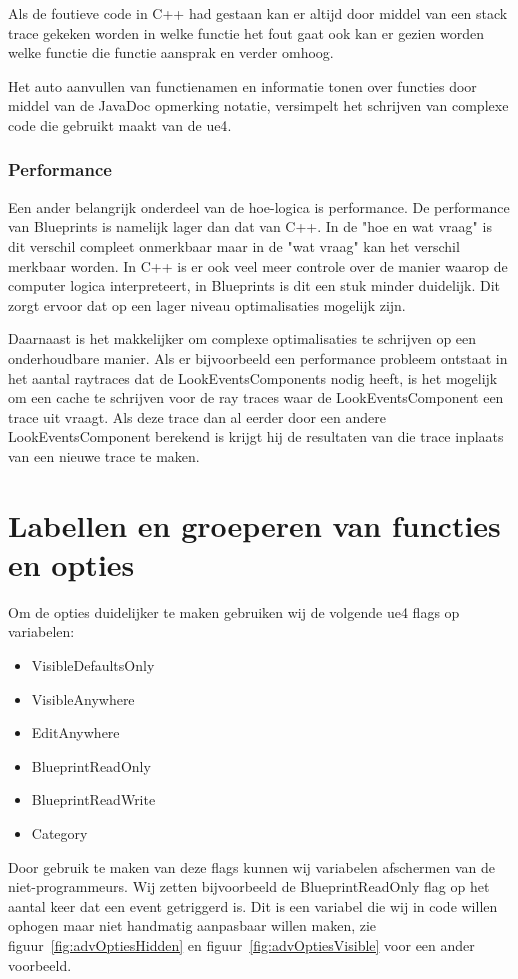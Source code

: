 Als de foutieve code in C++ had gestaan kan er altijd door middel van een stack trace gekeken worden in welke functie het fout gaat ook kan er gezien worden welke functie die functie aansprak en verder omhoog.

Het auto aanvullen van functienamen en informatie tonen over functies door middel van de JavaDoc opmerking notatie, versimpelt het schrijven van complexe code die gebruikt maakt van de \gls{ue4}. 

\subsubsection{Performance}
Een ander belangrijk onderdeel van de hoe-logica is performance. De performance van Blueprints is namelijk lager dan dat van C++. In de "hoe en wat vraag" is dit verschil compleet onmerkbaar maar in de "wat vraag" kan het verschil merkbaar worden.
In C++ is er ook veel meer controle over de manier waarop de computer logica interpreteert, in Blueprints is dit een stuk minder duidelijk. Dit zorgt ervoor dat op een lager niveau optimalisaties mogelijk zijn. 

Daarnaast is het makkelijker om complexe optimalisaties te schrijven op een onderhoudbare manier. Als er bijvoorbeeld een performance probleem ontstaat in het aantal raytraces dat de LookEventsComponents nodig heeft, is het mogelijk om een cache te schrijven voor de ray traces waar de LookEventsComponent een trace uit vraagt. Als deze trace dan al eerder door een andere LookEventsComponent berekend is krijgt hij de resultaten van die trace inplaats van een nieuwe trace te maken.

\section{Labellen en groeperen van functies en opties}
Om de opties duidelijker te maken gebruiken wij de volgende \gls{ue4} flags op variabelen:

\begin{itemize}
	\item VisibleDefaultsOnly
	\item VisibleAnywhere
	\item EditAnywhere
	\item BlueprintReadOnly
	\item BlueprintReadWrite
	\item Category
\end{itemize}

Door gebruik te maken van deze flags kunnen wij variabelen afschermen van de niet-programmeurs. Wij zetten bijvoorbeeld de BlueprintReadOnly flag op het aantal keer dat een event getriggerd is. Dit is een variabel die wij in code willen ophogen maar niet handmatig aanpasbaar willen maken, zie figuur~\ref{fig:advOptiesHidden} en figuur~\ref{fig:advOptiesVisible} voor een ander voorbeeld.

